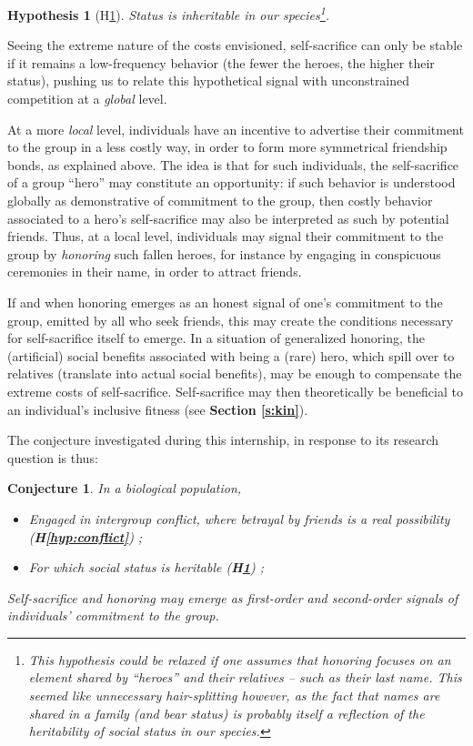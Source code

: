 \documentclass[a4paper,12pt]{report}
\newtheorem{hyp}{Hypothesis}
\newtheorem*{conj}{Conjecture}
\begin{document}
\begin{hyp}[H\ref{hyp:status}] \label{hyp:status}
    Status is inheritable in our species\footnote{
        This hypothesis could be relaxed if one assumes that honoring focuses
        on an element shared by “heroes” and their relatives –
        such as their last name. This seemed like unnecessary hair-splitting however,
        as the fact that names are shared in a family (and bear status) is probably
        itself a reflection of the heritability of social 
        status in our species.}.
    \end{hyp}

Seeing the extreme nature of the costs envisioned,
self-sacrifice can only be stable if it remains a low-frequency behavior
(the fewer the heroes, the higher their status), pushing us to relate this
hypothetical signal with unconstrained competition at a \emph{global} level.



At a more \emph{local} level, individuals have an incentive to advertise their commitment
to the group in a less costly way, in order to form more symmetrical friendship bonds,
as explained above. The idea is that for such individuals, the self-sacrifice of a group
“hero” may constitute an opportunity: if such behavior is understood globally as
demonstrative of commitment to the group, then costly behavior associated to a hero’s
self-sacrifice may also be interpreted as such by potential friends.
Thus, at a local level, individuals may signal their commitment
to the group by \emph{honoring} such fallen heroes, for instance
by engaging in conspicuous ceremonies in their name, in order to attract friends.

If and when honoring emerges as an honest signal of one’s commitment to the group,
emitted by all who seek friends, this may create the conditions necessary
for self-sacrifice itself to emerge. In a situation of generalized honoring,
the (artificial) social benefits associated with being a (rare) hero, which spill
over to relatives (translate into actual social benefits), may be enough to
compensate the extreme costs of self-sacrifice. Self-sacrifice may then theoretically
be beneficial to an individual’s inclusive fitness (see \textbf{Section \ref{s:kin}}).

The conjecture investigated during this internship, in response to its research
question is thus: 

\begin{conj}
    In a biological population,
    \begin{itemize}
    \item Engaged in intergroup conflict, where betrayal by friends
    is a real possibility (\textbf{H\ref{hyp:conflict}}) ;
    \item For which social status is heritable (\textbf{H\ref{hyp:status}}) ;
    \end{itemize}
    Self-sacrifice and honoring may emerge as first-order and second-order signals 
    of individuals’ commitment to the group.
\end{conj}
\end{document}
